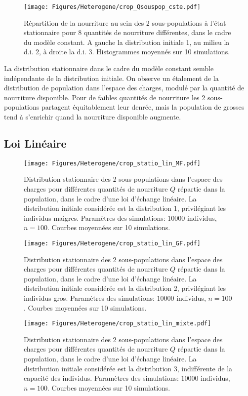 \begin{figure}[h!]
\centering
\texttt{[image: Figures/Heterogene/crop\_Qsouspop\_cste.pdf]}
\caption{Répartition de la nourriture au sein des 2 sous-populations à l'état stationnaire pour 8 quantités de nourriture différentes, dans le cadre du modèle constant. A gauche la distribution initiale 1, au milieu la d.i. 2, à droite la d.i. 3. Histogrammes moyennés sur 10 simulations.}
\label{Qsouspop_cste}
\end{figure}


La distribution stationnaire dans le cadre du modèle constant semble indépendante de la distribution initiale. On observe un étalement de la distribution de population dans l'espace des charges, modulé par la quantité de nourriture disponible. Pour de faibles quantités de nourriture les 2 sous-populations partagent équitablement leur denrée, mais la population de grosses tend à s'enrichir quand la nourriture disponible augmente.

\clearpage

\subsection{Loi Linéaire}

\begin{figure}[h!]
\centering
\texttt{[image: Figures/Heterogene/crop\_statio\_lin\_MF.pdf]}
\caption{Distribution stationnaire des 2 sous-populations dans l'espace des charges pour différentes quantités de nourriture $Q$ répartie dans la population, dans le cadre d'une loi d'échange linéaire. La distribution initiale considérée est la distribution 1, privilégiant les individus maigres. Paramètres des simulations: $10000$ individus, $n=100$. Courbes moyennées sur 10 simulations.}
\label{statio_lin_MF}
\end{figure}

\begin{figure}[h!]
\centering
\texttt{[image: Figures/Heterogene/crop\_statio\_lin\_GF.pdf]}
\caption{Distribution stationnaire des 2 sous-populations dans l'espace des charges pour différentes quantités de nourriture $Q$ répartie dans la population, dans le cadre d'une loi d'échange linéaire. La distribution initiale considérée est la distribution 2, privilégiant les individus gros. Paramètres des simulations: $10000$ individus, $n=100$. Courbes moyennées sur 10 simulations.}
\label{statio_lin_GF}
\end{figure}

\begin{figure}[h!]
\centering
\texttt{[image: Figures/Heterogene/crop\_statio\_lin\_mixte.pdf]}
\caption{Distribution stationnaire des 2 sous-populations dans l'espace des charges pour différentes quantités de nourriture $Q$ répartie dans la population, dans le cadre d'une loi d'échange linéaire. La distribution initiale considérée est la distribution 3, indifférente de la capacité des individus. Paramètres des simulations: $10000$ individus, $n=100$. Courbes moyennées sur 10 simulations.}
\label{statio_lin_mixte}
\end{figure}


